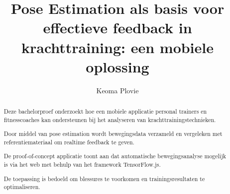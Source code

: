 \documentclass[a0,portrait]{hogent-poster}
\title{Pose Estimation als basis voor effectieve feedback in krachttraining: een mobiele oplossing}
\subtitle{}
\author{Keoma Plovie}
\begin{document}
\maketitle

\begin{abstract}
Deze bachelorproef onderzoekt hoe een mobiele applicatie personal trainers en fitnesscoaches kan ondersteunen bij het analyseren van krachttrainingstechnieken. 

Door middel van pose estimation wordt bewegingsdata verzameld en vergeleken met referentiemateriaal om realtime feedback te geven. 

De proof-of-concept applicatie toont aan dat automatische bewegingsanalyse mogelijk is via het web met behulp van het framework TensorFlow.js. 

De toepassing is bedoeld om blessures te voorkomen en trainingsresultaten te optimaliseren.
\end{abstract}
\end{document}
